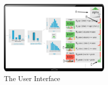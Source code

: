 \begin{figure}
\centering
\includegraphics[width=0.48\textwidth]{figures/risk_controller}
\caption{The \system{} User Interface}
\label{fig:riskcontroller}	
\end{figure}

